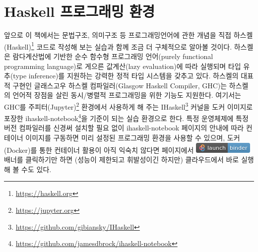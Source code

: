 \documentclass[b5paper,chapter,figtabcapt]{oblivoir}
\begin{document}
\chapter{Haskell 프로그래밍 환경}
앞으로 이 책에서는 문법구조, 의미구조 등 프로그래밍언어에 관한
개념을 직접 하스켈(Haskell)\footnote{\url{https://haskell.org}}
코드로 작성해 보는 실습과 함께 조금 더 구체적으로 알아볼 것이다.
하스켈은 람다계산법에 기반한 순수 함수형 프로그래밍 언어(purely
functional programming language)로 게으른 값계산(lazy evaluation)에
따라 실행되며 타입 유추(type inference)를 지원하는 강력한
정적 타입 시스템을 갖추고 있다. 하스켈의 대표적 구현인 글래스고우
하스켈 컴파일러(Glasgow Haskell Compiler, GHC)는
하스켈의 언어적 장점을 살린 동시/병렬적 프로그래밍을 위한 기능도
지원한다.
여기서는 GHC를 주피터(Jupyter)\footnote{\url{https://jupyter.org}}
환경에서 사용하게 해 주는 IHaskell\footnote{%
\url{https://github.com/gibiansky/IHaskell}} 커널을
도커 이미지로 포장한 ihaskell-notebook\footnote{%
\url{https://github.com/jamesdbrock/ihaskell-notebook}}을
기준이 되는 실습 환경으로 한다. 특정 운영체제에 특정 버전
컴파일러를 신경써 설치할 필요 없이 ihaskell-notebook
페이지의 안내에 따라 컨테이너 이미지를 구동하면 미리 설정된
프로그래밍 환경을 사용할 수 있으며, 도커(Docker)를 통한
컨테이너 활용이 아직 익숙치 않다면 페이지에서
\includegraphics[scale=.5]{mybinder_badge_logo.png} 배너를
클릭하기만 하면 (성능이 제한되고 휘발성이긴 하지만) 클라우드에서
바로 실행해 볼 수도 있다.

\newpage
\end{document}
